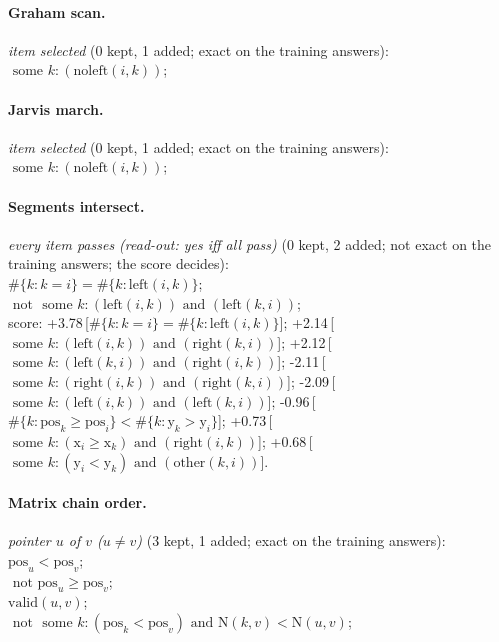 \documentclass[10pt]{article}
\begin{document}
{\paragraph{Graham scan.}
\emph{item selected} (0 kept, 1 added; exact on the training answers):\\
\quad $\text{ some } k: (\mathrm{noleft}(i, k))$;

\paragraph{Jarvis march.}
\emph{item selected} (0 kept, 1 added; exact on the training answers):\\
\quad $\text{ some } k: (\mathrm{noleft}(i, k))$;

\paragraph{Segments intersect.}
\emph{every item passes (read-out: yes iff all pass)} (0 kept, 2 added; not exact on the training answers; the score decides):\\
\quad $\#\{k: k = i\} = \#\{k: \mathrm{left}(i, k)\}$;\\
\quad $\text{ not } \text{ some } k: (\mathrm{left}(i, k)) \text{ and } (\mathrm{left}(k, i))$;\\
score: +3.78\,[$\#\{k: k = i\} = \#\{k: \mathrm{left}(i, k)\}$]; +2.14\,[$\text{ some } k: (\mathrm{left}(i, k)) \text{ and } (\mathrm{right}(k, i))$]; +2.12\,[$\text{ some } k: (\mathrm{left}(k, i)) \text{ and } (\mathrm{right}(i, k))$]; -2.11\,[$\text{ some } k: (\mathrm{right}(i, k)) \text{ and } (\mathrm{right}(k, i))$]; -2.09\,[$\text{ some } k: (\mathrm{left}(i, k)) \text{ and } (\mathrm{left}(k, i))$]; -0.96\,[$\#\{k: \mathrm{pos}_{k}  \geq  \mathrm{pos}_{i}\} < \#\{k: \mathrm{y}_{k} > \mathrm{y}_{i}\}$]; +0.73\,[$\text{ some } k: (\mathrm{x}_{i}  \geq  \mathrm{x}_{k}) \text{ and } (\mathrm{right}(i, k))$]; +0.68\,[$\text{ some } k: (\mathrm{y}_{i} < \mathrm{y}_{k}) \text{ and } (\mathrm{other}(k, i))$].

\paragraph{Matrix chain order.}
\emph{pointer $u$ of $v$ ($u \neq v$)} (3 kept, 1 added; exact on the training answers):\\
\quad $\mathrm{pos}_{u} < \mathrm{pos}_{v}$;\\
\quad $\text{ not } \mathrm{pos}_{u}  \geq  \mathrm{pos}_{v}$;\\
\quad $\mathrm{valid}(u, v)$;\\
\quad $\text{ not } \text{ some } k: (\mathrm{pos}_{k} < \mathrm{pos}_{v}) \text{ and } \mathrm{N}(k, v) < \mathrm{N}(u, v)$;

}
\end{document}
